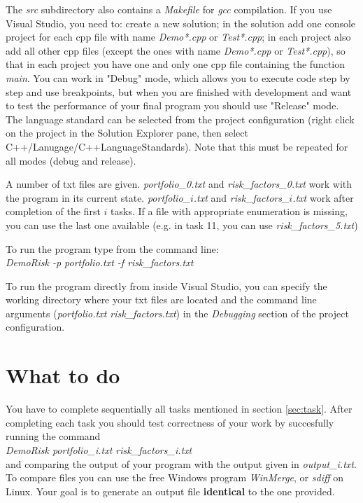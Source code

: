 \documentclass[10pt]{article}
\begin{document}
The \textit{src} subdirectory also contains a \textit{Makefile} for \textit{gcc} compilation. If you use Visual Studio, you need to: create a new solution; in the solution add one console project for each cpp file with name \textit{Demo*.cpp} or \textit{Test*.cpp}; in each project also add all other cpp files (except the ones with name \textit{Demo*.cpp} or \textit{Test*.cpp}), so that in each project you have one and only one cpp file containing the function \textit{main}. You can work in "Debug" mode, which allows you to execute code step by step and use breakpoints, but when you are finished with development and want to test the performance of your final program you should use "Release" mode. The language standard can be selected from the project configuration (right click on the project in the Solution Explorer pane, then  select C++/Lanugage/C++LanguageStandards). Note that this must be repeated for all modes (debug and release).

A number of txt files are given. \textit{portfolio\_0.txt} and \textit{risk\_factors\_0.txt} work with the program in its current state. \textit{portfolio\_$i$.txt} and \textit{risk\_factors\_$i$.txt} work after completion of the first $i$ tasks. If a file with appropriate enumeration is missing, you can use the last one available (e.g. in task 11, you can use \textit{risk\_factors\_5.txt})

To run the program type from the command line:\\
\textit{DemoRisk -p portfolio.txt -f risk\_factors.txt}

To run the program directly from inside Visual Studio, you can specify the working directory where your txt files are located and the command line arguments (\textit{portfolio.txt risk\_factors.txt}) in the \textit{Debugging} section of the project configuration.

\section{What to do}
You have to complete sequentially all tasks mentioned in section \ref{sec:task}. After completing each task you should test correctness of your work by succesfully running the command \\
\textit{DemoRisk portfolio\_i.txt risk\_factors\_i.txt}\\
and comparing the output of your program with the output given in \textit{output\_i.txt}.
To compare files you can use the free Windows program \textit{WinMerge}, or \textit{sdiff} on Linux. Your goal is to generate an output file \textbf{identical} to the one provided.
\end{document}

